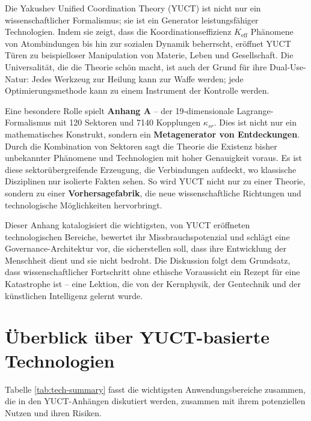 \documentclass[12pt,a4paper]{article}
\theoremstyle{remark}
\newcommand{\Keff}{K_{\mathrm{eff}}}
\begin{document}
	Die Yakushev Unified Coordination Theory (YUCT) ist nicht nur ein wissenschaftlicher Formalismus; sie ist ein Generator leistungsfähiger Technologien. Indem sie zeigt, dass die Koordinationseffizienz \(\Keff\) Phänomene von Atombindungen bis hin zur sozialen Dynamik beherrscht, eröffnet YUCT Türen zu beispielloser Manipulation von Materie, Leben und Gesellschaft. Die Universalität, die die Theorie schön macht, ist auch der Grund für ihre Dual-Use-Natur: Jedes Werkzeug zur Heilung kann zur Waffe werden; jede Optimierungsmethode kann zu einem Instrument der Kontrolle werden.
	
	Eine besondere Rolle spielt \textbf{Anhang A} – der 19‑dimensionale Lagrange-Formalismus mit 120 Sektoren und 7140 Kopplungen \(\kappa_{sr}\). Dies ist nicht nur ein mathematisches Konstrukt, sondern ein \textbf{Metagenerator von Entdeckungen}. Durch die Kombination von Sektoren sagt die Theorie die Existenz bisher unbekannter Phänomene und Technologien mit hoher Genauigkeit voraus. Es ist diese sektorübergreifende Erzeugung, die Verbindungen aufdeckt, wo klassische Disziplinen nur isolierte Fakten sehen. So wird YUCT nicht nur zu einer Theorie, sondern zu einer \textbf{Vorhersagefabrik}, die neue wissenschaftliche Richtungen und technologische Möglichkeiten hervorbringt.
	
	Dieser Anhang katalogisiert die wichtigsten, von YUCT eröffneten technologischen Bereiche, bewertet ihr Missbrauchspotenzial und schlägt eine Governance-Architektur vor, die sicherstellen soll, dass ihre Entwicklung der Menschheit dient und sie nicht bedroht. Die Diskussion folgt dem Grundsatz, dass wissenschaftlicher Fortschritt ohne ethische Voraussicht ein Rezept für eine Katastrophe ist – eine Lektion, die von der Kernphysik, der Gentechnik und der künstlichen Intelligenz gelernt wurde.
	
	\section{Überblick über YUCT-basierte Technologien}
	\label{sec:overview}
	
	Tabelle \ref{tab:tech-summary} fasst die wichtigsten Anwendungsbereiche zusammen, die in den YUCT-Anhängen diskutiert werden, zusammen mit ihrem potenziellen Nutzen und ihren Risiken.
	
\end{document}
